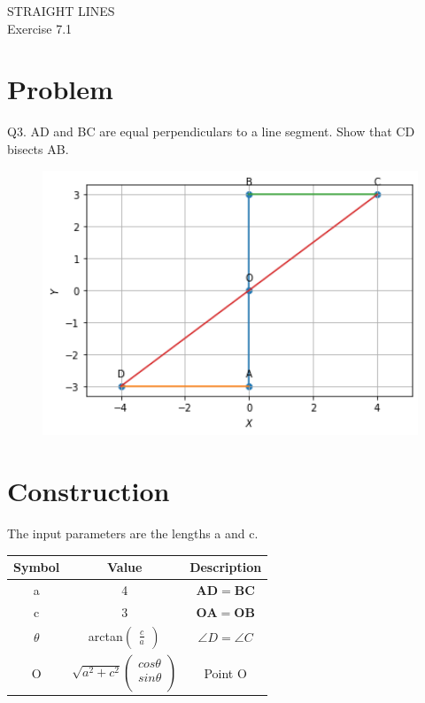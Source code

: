 \documentclass[10pt,a4paper]{article}
\title{\mytitle}
\newcommand{\myvec}[1]{\ensuremath{\begin{pmatrix}#1\end{pmatrix}}}
\let\vec\mathbf
\begin{document}
\begin{center}
\textbf\large{ STRAIGHT LINES}\\
\textbf\large{Exercise 7.1}
\end{center}

\tableofcontents
\section{Problem}
Q3. AD and BC are equal perpendiculars to a line segment. Show that CD bisects AB.
\begin{figure}[!h]
	\begin{center}
		\includegraphics[width=5in]{./figs/figure.png}
	\end{center}
\caption{}
\label{figure}
\end{figure}
\pagebreak
\section{Construction}
The input parameters are the lengths a and c.\\
{
\setlength\extrarowheight{2pt}
\begin{tabular}{|c|c|c|}
	\hline
	\textbf{Symbol}&\textbf{Value}&\textbf{Description}\\
	\hline
	a&4&$\vec{A}\vec{D}=\vec{B}\vec{C}$\\
	\hline
	c&3&$\vec{O}\vec{A}=\vec{O}\vec{B}$\\
	\hline
	$\theta$&arctan$\myvec{\frac{c}{a}}$&$\angle{D}=\angle{C}$\\
	\hline
	O&$\sqrt{a^2+c^2}%
	\begin{pmatrix}
		cos\theta\\
		sin\theta\\
	\end{pmatrix}$%
	&Point O\\
	\hline
\end{tabular}
}
\end{document}
